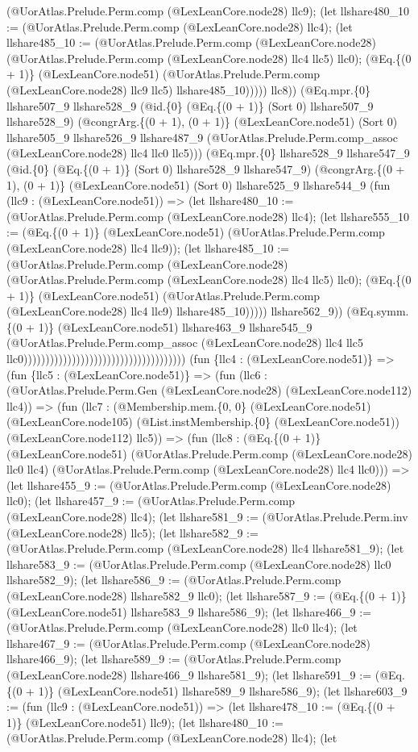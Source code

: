 \documentclass[11pt]{article}
\begin{document}
(@UorAtlas.Prelude.Perm.comp (@LexLeanCore.node28) llc9); (let llshare480\_10 := (@UorAtlas.Prelude.Perm.comp (@LexLeanCore.node28) llc4); (let llshare485\_10 := (@UorAtlas.Prelude.Perm.comp (@LexLeanCore.node28) (@UorAtlas.Prelude.Perm.comp (@LexLeanCore.node28) llc4 llc5) llc0); (@Eq.\{(0 + 1)\} (@LexLeanCore.node51) (@UorAtlas.Prelude.Perm.comp (@LexLeanCore.node28) llc9 llc5) llshare485\_10))))) llc8)) (@Eq.mpr.\{0\} llshare507\_9 llshare528\_9 (@id.\{0\} (@Eq.\{(0 + 1)\} (Sort 0) llshare507\_9 llshare528\_9) (@congrArg.\{(0 + 1), (0 + 1)\} (@LexLeanCore.node51) (Sort 0) llshare505\_9 llshare526\_9 llshare487\_9 (@UorAtlas.Prelude.Perm.comp\_assoc (@LexLeanCore.node28) llc4 llc0 llc5))) (@Eq.mpr.\{0\} llshare528\_9 llshare547\_9 (@id.\{0\} (@Eq.\{(0 + 1)\} (Sort 0) llshare528\_9 llshare547\_9) (@congrArg.\{(0 + 1), (0 + 1)\} (@LexLeanCore.node51) (Sort 0) llshare525\_9 llshare544\_9 (fun (llc9 : (@LexLeanCore.node51)) => (let llshare480\_10 := (@UorAtlas.Prelude.Perm.comp (@LexLeanCore.node28) llc4); (let llshare555\_10 := (@Eq.\{(0 + 1)\} (@LexLeanCore.node51) (@UorAtlas.Prelude.Perm.comp (@LexLeanCore.node28) llc4 llc9)); (let llshare485\_10 := (@UorAtlas.Prelude.Perm.comp (@LexLeanCore.node28) (@UorAtlas.Prelude.Perm.comp (@LexLeanCore.node28) llc4 llc5) llc0); (@Eq.\{(0 + 1)\} (@LexLeanCore.node51) (@UorAtlas.Prelude.Perm.comp (@LexLeanCore.node28) llc4 llc9) llshare485\_10))))) llshare562\_9)) (@Eq.symm.\{(0 + 1)\} (@LexLeanCore.node51) llshare463\_9 llshare545\_9 (@UorAtlas.Prelude.Perm.comp\_assoc (@LexLeanCore.node28) llc4 llc5 llc0))))))))))))))))))))))))))))))))))))) (fun \{llc4 : (@LexLeanCore.node51)\} => (fun \{llc5 : (@LexLeanCore.node51)\} => (fun (llc6 : (@UorAtlas.Prelude.Perm.Gen (@LexLeanCore.node28) (@LexLeanCore.node112) llc4)) => (fun (llc7 : (@Membership.mem.\{0, 0\} (@LexLeanCore.node51) (@LexLeanCore.node105) (@List.instMembership.\{0\} (@LexLeanCore.node51)) (@LexLeanCore.node112) llc5)) => (fun (llc8 : (@Eq.\{(0 + 1)\} (@LexLeanCore.node51) (@UorAtlas.Prelude.Perm.comp (@LexLeanCore.node28) llc0 llc4) (@UorAtlas.Prelude.Perm.comp (@LexLeanCore.node28) llc4 llc0))) => (let llshare455\_9 := (@UorAtlas.Prelude.Perm.comp (@LexLeanCore.node28) llc0); (let llshare457\_9 := (@UorAtlas.Prelude.Perm.comp (@LexLeanCore.node28) llc4); (let llshare581\_9 := (@UorAtlas.Prelude.Perm.inv (@LexLeanCore.node28) llc5); (let llshare582\_9 := (@UorAtlas.Prelude.Perm.comp (@LexLeanCore.node28) llc4 llshare581\_9); (let llshare583\_9 := (@UorAtlas.Prelude.Perm.comp (@LexLeanCore.node28) llc0 llshare582\_9); (let llshare586\_9 := (@UorAtlas.Prelude.Perm.comp (@LexLeanCore.node28) llshare582\_9 llc0); (let llshare587\_9 := (@Eq.\{(0 + 1)\} (@LexLeanCore.node51) llshare583\_9 llshare586\_9); (let llshare466\_9 := (@UorAtlas.Prelude.Perm.comp (@LexLeanCore.node28) llc0 llc4); (let llshare467\_9 := (@UorAtlas.Prelude.Perm.comp (@LexLeanCore.node28) llshare466\_9); (let llshare589\_9 := (@UorAtlas.Prelude.Perm.comp (@LexLeanCore.node28) llshare466\_9 llshare581\_9); (let llshare591\_9 := (@Eq.\{(0 + 1)\} (@LexLeanCore.node51) llshare589\_9 llshare586\_9); (let llshare603\_9 := (fun (llc9 : (@LexLeanCore.node51)) => (let llshare478\_10 := (@Eq.\{(0 + 1)\} (@LexLeanCore.node51) llc9); (let llshare480\_10 := (@UorAtlas.Prelude.Perm.comp (@LexLeanCore.node28) llc4); (let 
\end{document}

